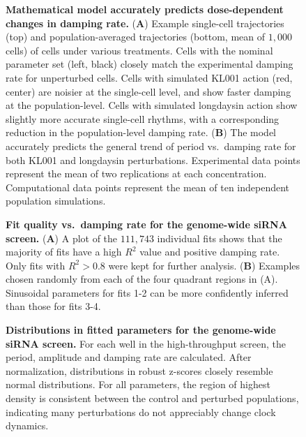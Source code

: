 \documentclass[11pt, letterpaper]{article}
\begin{document}
\begin{figure}[h!]
  \begin{center}
  \end{center}
  \caption{{\bfseries Mathematical model accurately predicts dose-dependent changes in damping rate.}
({\bfseries A}) Example single-cell trajectories (top) and population-averaged trajectories (bottom, mean of $1,000$ cells) of cells under various treatments. Cells with the nominal parameter set (left, black) closely match the experimental damping rate for unperturbed cells. Cells with simulated KL001 action (red, center) are noisier at the single-cell level, and show faster damping at the population-level. Cells with simulated longdaysin action show slightly more accurate single-cell rhythms, with a corresponding reduction in the population-level damping rate.
({\bfseries B}) The model accurately predicts the general trend of period vs.\ damping rate for both KL001 and longdaysin perturbations. Experimental data points represent the mean of two replications at each concentration. Computational data points represent the mean of ten independent population simulations.}
\label{fig:simulation}
\end{figure}

\begin{figure}[h!]
  \begin{center}
  \end{center}
  \caption{{\bfseries Fit quality vs.\ damping rate for the genome-wide siRNA screen.}
({\bfseries A}) A plot of the $111,743$ individual fits shows that the majority of fits have a high $R^2$ value and positive damping rate. Only fits with $R^2 > 0.8$ were kept for further analysis.
({\bfseries B}) Examples chosen randomly from each of the four quadrant regions in (A). Sinusoidal parameters for fits 1-2 can be more confidently inferred than those for fits 3-4.}
\label{fig:fit_quality}
\end{figure}

\begin{figure}[h!]
  \begin{center}
  \end{center}
  \caption{{\bfseries Distributions in fitted parameters for the genome-wide siRNA screen.} For each well in the high-throughput screen, the period, amplitude and damping rate are calculated. After normalization, distributions in robust z-scores closely resemble normal distributions. For all parameters, the region of highest density is consistent between the control and perturbed populations, indicating many perturbations do not appreciably change clock dynamics.} 
\label{fig:fit_distributions}
\end{figure}
\end{document}
